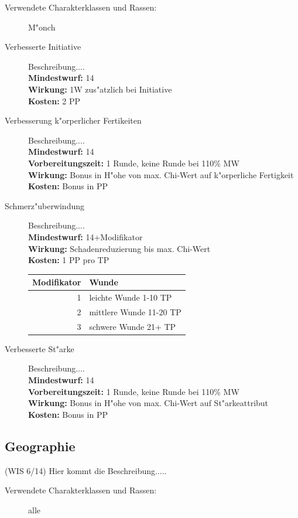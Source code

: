 \begin{description}

\item [Verwendete Charakterklassen und Rassen:] M"onch

\item [Verbesserte Initiative] Beschreibung....\\
\textbf{Mindestwurf:} 14\\
\textbf{Wirkung:} 1W zus"atzlich bei Initiative\\
\textbf{Kosten:} 2 PP

\item [Verbesserung k"orperlicher Fertikeiten] Beschreibung....\\
\textbf{Mindestwurf:} 14\\
\textbf{Vorbereitungszeit:} 1 Runde, keine Runde bei 110\% MW\\
\textbf{Wirkung:} Bonus in H"ohe von max. Chi-Wert auf k"orperliche Fertigkeit\\
\textbf{Kosten:} Bonus in PP

\item [Schmerz"uberwindung] Beschreibung....\\
\textbf{Mindestwurf:} 14+Modifikator\\
\textbf{Wirkung:} Schadenreduzierung bis max. Chi-Wert\\
\textbf{Kosten:} 1 PP pro TP\\
\par \begin{tabular}{r|l}
Modifikator & Wunde\\
\hline
1 & leichte Wunde 1-10 TP\\
2 & mittlere Wunde 11-20 TP\\
3 & schwere Wunde 21+ TP\\
\end{tabular}

\item [Verbesserte St"arke] Beschreibung....\\
\textbf{Mindestwurf:} 14\\
\textbf{Vorbereitungszeit:} 1 Runde, keine Runde bei 110\% MW\\
\textbf{Wirkung:} Bonus in H"ohe von max. Chi-Wert auf St"arkeattribut\\
\textbf{Kosten:} Bonus in PP

\end{description}

\subsection{Geographie}
\par (WIS 6/14) Hier kommt die Beschreibung.....
\begin{description}
\item [Verwendete Charakterklassen und Rassen:] alle
\end{description}

